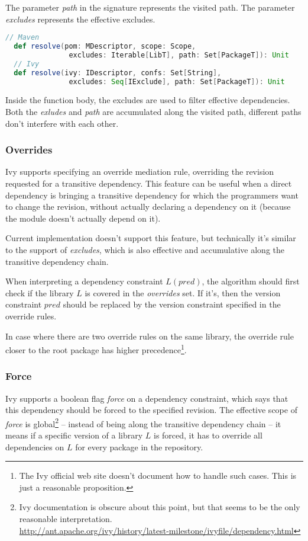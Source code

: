The parameter \emph{path} in the signature represents the visited path. The parameter \emph{excludes} represents the effective excludes.

\begin{lstlisting}[language=Scala]
  // Maven
  def resolve(pom: MDescriptor, scope: Scope,
               excludes: Iterable[LibT], path: Set[PackageT]): Unit
  // Ivy
  def resolve(ivy: IDescriptor, confs: Set[String],
               excludes: Seq[IExclude], path: Set[PackageT]): Unit
\end{lstlisting}

Inside the function body, the excludes are used to filter effective dependencies. Both the \emph{exludes} and \emph{path} are accumulated along the visited path, different paths don't interfere with each other.

\subsubsection{Overrides}

Ivy supports specifying an override mediation rule, overriding the revision requested for a transitive dependency. This feature can be useful when a direct dependency is bringing a transitive dependency for which the programmers want to change the revision, without actually declaring a dependency on it (because the module doesn't actually depend on it).

Current implementation doesn't support this feature, but technically it's similar to the support of \emph{excludes}, which is also effective and accumulative along the transitive dependency chain.

When interpreting a dependency constraint $L(pred)$, the algorithm should first check if the library $L$ is covered in the \emph{overrides} set. If it's, then the version constraint $pred$ should be replaced by the version constraint specified in the override rules.

In case where there are two override rules on the same library, the override rule closer to the root package has higher precedence\footnote{The Ivy official web site doesn't document how to handle such cases. This is just a reasonable proposition.}.

\subsubsection{Force}

Ivy supports a boolean flag \emph{force} on a dependency constraint, which says that this dependency
should be forced to the specified revision. The effective scope of \emph{force} is global\footnote{Ivy documentation is obscure about this point, but that seems to be the only reasonable interpretation. \\\url{http://ant.apache.org/ivy/history/latest-milestone/ivyfile/dependency.html}} -- instead of being along the transitive dependency chain -- it means if a specific version of a library $L$ is forced, it has to override all dependencies on $L$ for every package in the repository.

